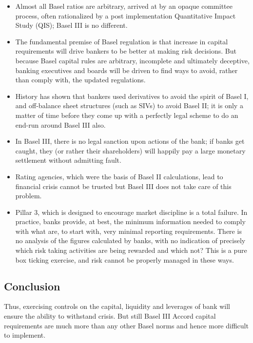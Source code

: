 \documentclass[11pt]{article}
\numberwithin{equation}{section}
\begin{document}
\begin{itemize}
\item Almost all Basel ratios are arbitrary, arrived at by an opaque committee process, often rationalized by a post implementation Quantitative Impact Study (QIS); Basel III is no different. 

\item The fundamental premise of Basel regulation is that increase in capital requirements will drive bankers to be better at making risk decisions. But because Basel capital rules are arbitrary, incomplete and ultimately deceptive, banking executives and boards will be driven to find ways to avoid, rather than comply with, the updated regulations. 

\item History has shown that bankers used derivatives to avoid the spirit of Basel I, and off-balance sheet structures (such as SIVs) to avoid Basel II; it is only a matter of time before they come up with a perfectly legal scheme to do an end-run around Basel III also. 

\item  In Basel III, there is no legal sanction upon actions of the bank; if banks get caught, they (or rather their shareholders) will happily pay a large monetary settlement without admitting fault.

\item  Rating agencies, which were the basis of Basel II calculations, lead to financial crisis cannot be trusted but Basel III does not take care of this problem. 

\item Pillar 3, which is designed to encourage market discipline is a total failure. In practice, banks provide, at best, the minimum information needed to comply with what are, to start with, very minimal reporting requirements. There is no analysis of the figures calculated by banks, with no indication of precisely which risk taking activities are being rewarded and which not? This is a pure box ticking exercise, and risk cannot be properly managed in these ways. 

\end{itemize} 

\subsection{Conclusion}
\medskip

Thus, exercising controls on the capital, liquidity and leverages of bank will ensure the ability to withstand crisis. But still Basel III Accord capital requirements are much more than any other Basel norms and hence more difficult to implement.   
\end{document}
